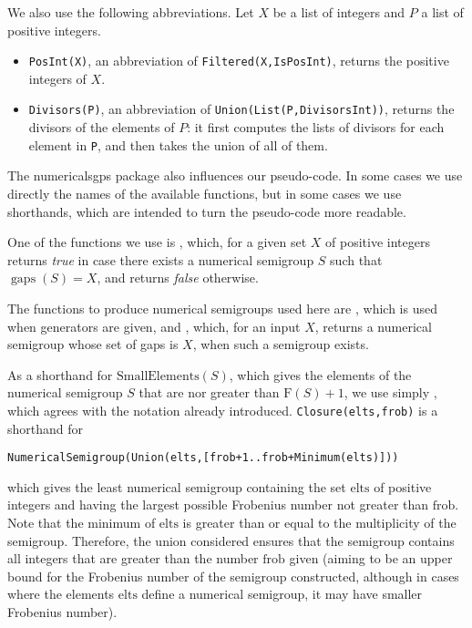 \documentclass[11pt]{amsart}
\theoremstyle{remark}
\begin{document}
We also use the following abbreviations. Let $X$ be a list of integers and $P$ a list of positive integers.
\begin{itemize} \itemsep2pt
\item \texttt{PosInt(X)}, an abbreviation of \texttt{Filtered(X,IsPosInt)}, returns the positive integers of $X$.
\item \texttt{Divisors(P)}, an abbreviation of \texttt{Union(List(P,DivisorsInt))}, returns the divisors of the elements of $P$: it first computes the lists of divisors for each element in \texttt{P}, and then takes the union of all of them.
\end{itemize}

The \textsf{numericalsgps} package also influences our pseudo-code. In some cases we use directly the names of the available functions, but in some cases we use shorthands, which are intended to turn the pseudo-code more readable.

One of the functions we use is \RepresentsGapsOfNumericalSemigroup, which, for a given set $X$ of positive integers returns \emph{true} in case there exists a numerical semigroup $S$ such that $\operatorname{gaps}(S)=X$, and returns \emph{false} otherwise. 

The functions to produce numerical semigroups used here are \NumericalSemigroup, which is used when generators are given, and \NumericalSemigroupByGaps, which, for an input $X$, returns a numerical semigroup whose set of gaps is $X$, when such a semigroup exists.    

As a shorthand for $\mathrm{SmallElements}(S)$, which gives the elements of the numerical semigroup $S$ that are nor greater than $\mathrm{F}(S)+1$, we use simply  \SmallElements, which agrees with the notation already introduced.
\texttt{Closure(elts,frob)} is a shorthand for
\begin{center}
\texttt{NumericalSemigroup(Union(elts,[frob+1..frob+Minimum(elts)]))}
\end{center}
which gives the least numerical semigroup containing the set $\mathrm{elts}$ of positive integers and having the largest possible Frobenius number not greater than $\mathrm{frob}$.
Note that the minimum of $\mathrm{elts}$ is greater than or equal to the multiplicity of the semigroup. Therefore, the union considered ensures that the semigroup contains all integers that are greater than the number $\mathrm{frob}$ given (aiming to be an upper bound for the Frobenius number of the semigroup constructed, although in cases where the elements $\mathrm{elts}$ define a numerical semigroup, it may have smaller Frobenius number).
\end{document}
